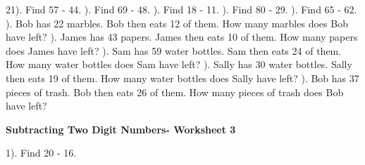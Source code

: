 \documentclass{article}%
\begin{document}
21). Find 57 {-} 44.%
\newline%
\newline%
). Find 69 {-} 48.%
\newline%
\newline%
). Find 18 {-} 11.%
\newline%
\newline%
). Find 80 {-} 29.%
\newline%
\newline%
). Find 65 {-} 62.%
\newline%
\newline%
). Bob has 22 marbles. Bob then eats 12 of them. How many marbles does Bob have left?%
\newline%
\newline%
). James has 43 papers. James then eats 10 of them. How many papers does James have left?%
\newline%
\newline%
). Sam has 59 water bottles. Sam then eats 24 of them. How many water bottles does Sam have left?%
\newline%
\newline%
). Sally has 30 water bottles. Sally then eats 19 of them. How many water bottles does Sally have left?%
\newline%
\newline%
). Bob has 37 pieces of trash. Bob then eats 26 of them. How many pieces of trash does Bob have left?%
\newline%
\newline%
\newline%
\pagebreak%
\large%
\begin{center}%
\textbf{Subtracting Two Digit Numbers- Worksheet 3}%
\newline%
\newline%
\newline%
\end{center} \normalsize%
1). Find 20 {-} 16.%
\newline%
\newline%
\newline%
\end{document}
